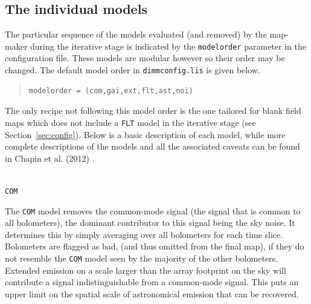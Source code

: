 \documentclass[twoside,11pt]{article}
\newcommand{\htmlref}[2]{#1}
\newcommand{\latexhtml}[2]{#1}
\newcommand{\xlabel}[1]{}
\renewcommand{\_}{\texttt{\symbol{95}}}
\newenvironment{myquote}{\begin{quote}\begin{small}}{\end{small}\end{quote}}
\newcommand{\cref}[3]{\latexhtml{#1~\ref{#2}}{\htmlref{#3}{#2}}}
\begin{document}
\raggedbottom
\subsection{\xlabel{models}The individual models}
\label{sec:models}

The particular sequence of the models evaluated (and removed) by the
map-maker during the iterative stage is indicated by the
\texttt{modelorder} parameter in the configuration file. These models
are modular however so their order may be changed. The default model
order in \texttt{dimmconfig.lis} is given below.
\vspace{-0.1cm}
\begin{myquote}
\begin{verbatim}
modelorder = (com,gai,ext,flt,ast,noi)
\end{verbatim}
\end{myquote}
\vspace{-0.1cm}
The only recipe not following this model order is the one tailored for
blank field maps which does not include a \texttt{FLT} model in the
iterative stage (see \cref{Section}{sec:config}{Specialised
configuration files}). Below is a basic
description of each model, while more complete descriptions of the
models and all the associated caveats can be found in Chapin et al.
(2012) \cite{mapmaker}.
\\ \\
\begin{minipage}[t]{0.07\linewidth}
\texttt{COM}
\end{minipage}
\begin{minipage}[t]{0.92\linewidth}The \texttt{COM} model removes the
common-mode signal (the signal that is common to all bolometers), the
dominant contributor to this signal being the sky noise. It determines
this by simply averaging over all bolometers for each time slice.
Bolometers are flagged as bad, (and thus omitted from the final map), if
they do not resemble the \texttt{COM} model seen by the majority of the
other bolometers.
\newline Extended emission on a scale larger than the array footprint
on the sky will contribute a signal indistinguishable from a
common-mode signal. This puts an upper limit on the spatial scale of
astronomical emission that can be recovered. \\
\end{minipage}
\end{document}
